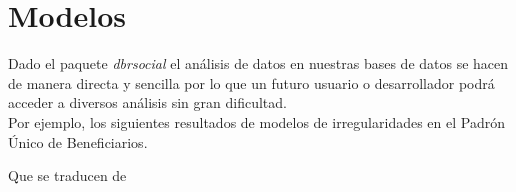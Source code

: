 \chapter{Modelos}
Dado el paquete \textit{dbrsocial} el análisis de datos en nuestras bases de datos se hacen de manera directa y sencilla por lo que un futuro usuario o desarrollador podrá acceder a diversos análisis sin gran dificultad.\\
Por ejemplo, los siguientes resultados de modelos de irregularidades en el Padrón Único de Beneficiarios.

Que se traducen de

